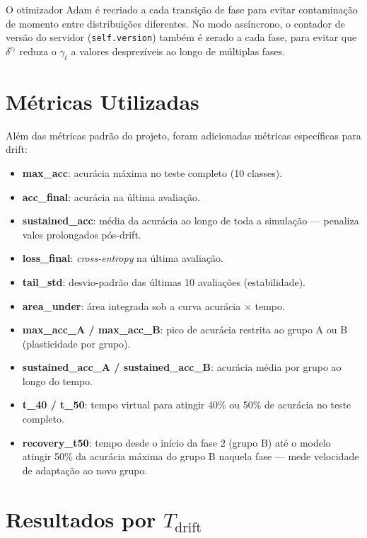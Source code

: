 \documentclass[12pt, a4paper]{article}
\begin{document}
O otimizador Adam é recriado a cada transição de fase para evitar
contaminação de momento entre distribuições diferentes. No modo assíncrono, o
contador de versão do servidor (\texttt{self.version}) também é zerado a cada
fase, para evitar que $\delta^{v_t}$ reduza o $\gamma_t$ a valores
desprezíveis ao longo de múltiplas fases.

\section{Métricas Utilizadas}

Além das métricas padrão do projeto, foram adicionadas métricas específicas
para drift:

\begin{itemize}
    \item \textbf{max\_acc}: acurácia máxima no teste completo (10 classes).
    \item \textbf{acc\_final}: acurácia na última avaliação.
    \item \textbf{sustained\_acc}: média da acurácia ao longo de toda a
    simulação --- penaliza vales prolongados pós-drift.
    \item \textbf{loss\_final}: \textit{cross-entropy} na última avaliação.
    \item \textbf{tail\_std}: desvio-padrão das últimas 10 avaliações
    (estabilidade).
    \item \textbf{area\_under}: área integrada sob a curva acurácia $\times$
    tempo.
    \item \textbf{max\_acc\_A / max\_acc\_B}: pico de acurácia restrita ao
    grupo A ou B (plasticidade por grupo).
    \item \textbf{sustained\_acc\_A / sustained\_acc\_B}: acurácia média por
    grupo ao longo do tempo.
    \item \textbf{t\_40 / t\_50}: tempo virtual para atingir 40\% ou 50\% de
    acurácia no teste completo.
    \item \textbf{recovery\_t50}: tempo desde o início da fase 2 (grupo B)
    até o modelo atingir 50\% da acurácia máxima do grupo B naquela fase ---
    mede velocidade de adaptação ao novo grupo.
\end{itemize}

\section{Resultados por $T_{\text{drift}}$}
\end{document}
